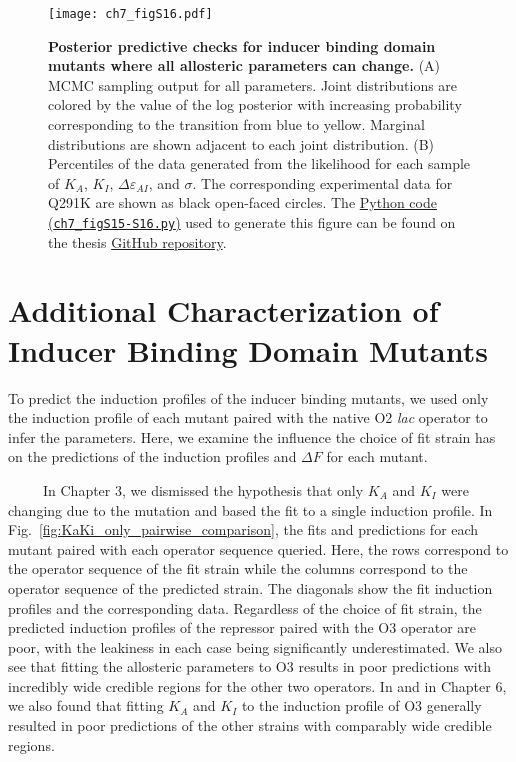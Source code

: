 \documentclass[12pt]{caltech_thesis}
\begin{document}
\hypertarget{fig:kaki_epai_post_predictive}{%
\begin{figure}
\centering
\texttt{[image: ch7\_figS16.pdf]}
\caption[{Posterior predictive checks for inducer binding domain mutants
where all allosteric parameter can change.}]{\textbf{Posterior
predictive checks for inducer binding domain mutants where all
allosteric parameters can change.} (A) MCMC sampling output for all
parameters. Joint distributions are colored by the value of the log
posterior with increasing probability corresponding to the transition
from blue to yellow. Marginal distributions are shown adjacent to each
joint distribution. (B) Percentiles of the data generated from the
likelihood for each sample of \(K_A\), \(K_I\),
\(\Delta\varepsilon_{AI}\), and \(\sigma\). The corresponding
experimental data for Q291K are shown as black open-faced circles. The
\href{https://github.com/gchure/phd/blob/master/src/chapter_07/code/ch7_figS15-S16.py}{Python
code (\texttt{ch7\_figS15-S16.py})} used to generate this figure can be
found on the thesis \href{https://github.com/gchure/phd}{GitHub
repository}.}
\label{fig:kaki_epai_post_predictive}
\end{figure}
}

\hypertarget{additional-characterization-of-inducer-binding-domain-mutants}{%
\section{Additional Characterization of Inducer Binding Domain
Mutants}\label{additional-characterization-of-inducer-binding-domain-mutants}}

To predict the induction profiles of the inducer binding mutants, we
used only the induction profile of each mutant paired with the native O2
\emph{lac} operator to infer the parameters. Here, we examine the
influence the choice of fit strain has on the predictions of the
induction profiles and \(\Delta F\) for each mutant.

~~~~~In Chapter 3, we dismissed the hypothesis that only \(K_A\) and
\(K_I\) were changing due to the mutation and based the fit to a single
induction profile. In Fig.~\ref{fig:KaKi_only_pairwise_comparison}, the
fits and predictions for each mutant paired with each operator sequence
queried. Here, the rows correspond to the operator sequence of the fit
strain while the columns correspond to the operator sequence of the
predicted strain. The diagonals show the fit induction profiles and the
corresponding data. Regardless of the choice of fit strain, the
predicted induction profiles of the repressor paired with the O3
operator are poor, with the leakiness in each case being significantly
underestimated. We also see that fitting the allosteric parameters to O3
results in poor predictions with incredibly wide credible regions for
the other two operators. In \textcite{razo-mejia2018} and in Chapter 6,
we also found that fitting \(K_A\) and \(K_I\) to the induction profile
of O3 generally resulted in poor predictions of the other strains with
comparably wide credible regions.
\end{document}
